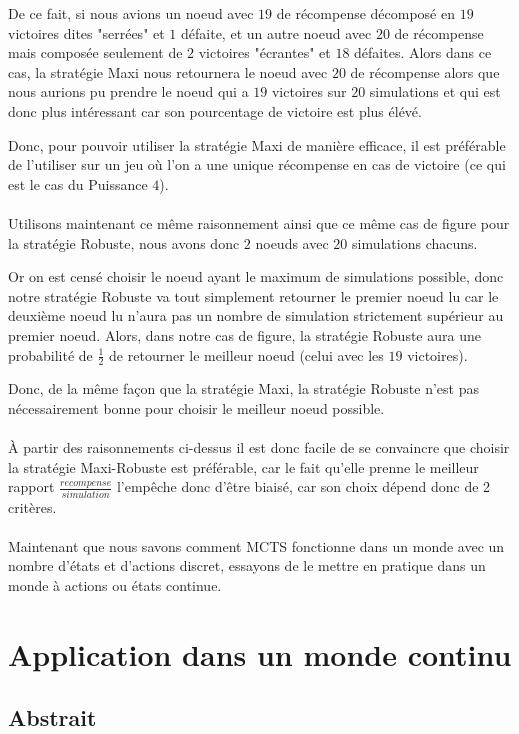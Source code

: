 \documentclass[pdftex,french, english]{article}	%
\begin{document}
De ce fait, si nous avions un noeud avec $19$ de récompense décomposé en $19$ victoires dites "serrées" et $1$ défaite, et un autre noeud avec $20$ de récompense mais composée seulement de $2$ victoires "écrantes" et $18$ défaites.
Alors dans ce cas, la stratégie Maxi nous retournera le noeud avec $20$ de récompense alors que nous aurions pu prendre le noeud qui a $19$ victoires sur $20$ simulations et qui est donc plus intéressant car son pourcentage de victoire est plus élévé.

Donc, pour pouvoir utiliser la stratégie Maxi de manière efficace, il est préférable de l'utiliser sur un jeu où l'on a une unique récompense en cas de victoire (ce qui est le cas du Puissance $4$).
\\ \\
Utilisons maintenant ce même raisonnement ainsi que ce même cas de figure pour la stratégie Robuste, nous avons donc $2$ noeuds avec $20$ simulations chacuns. 

Or on est censé choisir le noeud ayant le maximum de simulations possible, donc notre stratégie Robuste va tout simplement retourner le premier noeud lu car le deuxième noeud lu n'aura pas un nombre de simulation strictement supérieur au premier noeud. Alors, dans notre cas de figure, la stratégie Robuste aura une probabilité de $\frac{1}{2}$ de retourner le meilleur noeud (celui avec les $19$ victoires).

Donc, de la même façon que la stratégie Maxi, la stratégie Robuste n'est pas nécessairement bonne pour choisir le meilleur noeud possible.
\\ \\
À partir des raisonnements ci-dessus il est donc facile de se convaincre que choisir la stratégie Maxi-Robuste est préférable, car le fait qu'elle prenne le meilleur rapport $\frac{recompense}{simulation}$ l'empêche donc d'être biaisé, car son choix dépend donc de 2 critères.
\\ \\
Maintenant que nous savons comment MCTS fonctionne dans un monde avec un nombre d'états et d'actions discret, essayons de le mettre en pratique dans un monde à actions ou états continue.

\newpage
\section{Application dans un monde continu}
\subsection{Abstrait}
\end{document}
